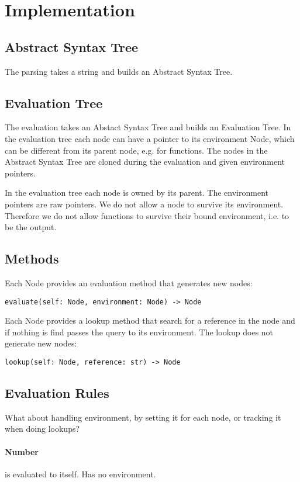 \documentclass[a4paper,12pt]{article}
\begin{document}
\section{Implementation}

\subsection{Abstract Syntax Tree}
The parsing takes a string and builds an Abstract Syntax Tree.

\subsection{Evaluation Tree}

The evaluation takes an Abstact Syntax Tree and builds an Evaluation Tree. In the evaluation tree each node can have a pointer to its environment Node, which can be different from its parent node, e.g. for functions. The nodes in the Abstract Syntax Tree are cloned during the evaluation and given environment pointers.

In the evaluation tree each node is owned by its parent. The environment pointers are raw pointers. We do not allow a node to survive its environment. Therefore we do not allow functions to survive their bound environment, i.e. to be the output.

\subsection{Methods}

Each Node provides an evaluation method that generates new nodes:
\begin{verbatim}
evaluate(self: Node, environment: Node) -> Node
\end{verbatim}
Each Node provides a lookup method that search for a reference in the node and if nothing is find passes the query to its environment. The lookup does not generate new nodes:
\begin{verbatim}
lookup(self: Node, reference: str) -> Node
\end{verbatim}

\subsection{Evaluation Rules}
What about handling environment, by setting it for each node, or tracking it when doing lookups?

\paragraph{Number} is evaluated to itself. Has no environment.
\end{document}
